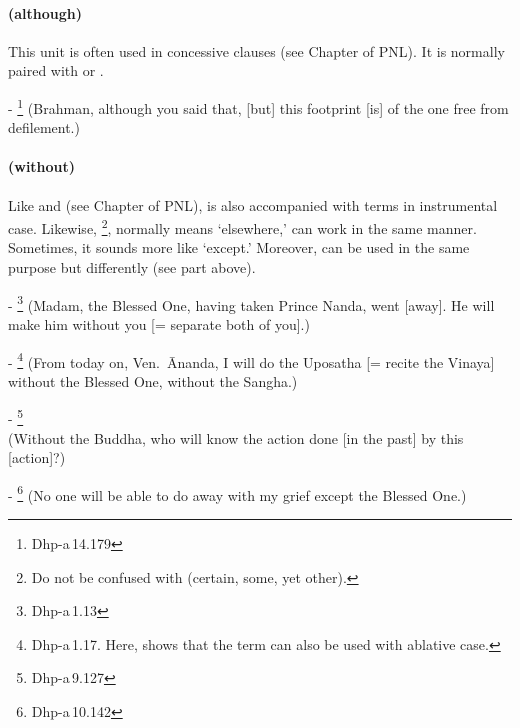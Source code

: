 \paragraph*{ (although)} This unit is often used in concessive clauses (see Chapter  of PNL). It is normally paired with  or .\par
- \footnote{Dhp-a\,14.179} (Brahman, although you said that, [but] this footprint [is] of the one free from defilement.)\par

\paragraph*{ (without)} Like  and  (see Chapter  of PNL),  is also accompanied with terms in instrumental case. Likewise, \footnote{Do not be confused with  (certain, some, yet other).}, normally means `elsewhere,' can work in the same manner. Sometimes, it sounds more like `except.' Moreover,  can be used in the same purpose but differently (see  part above).\par
- \footnote{Dhp-a\,1.13} (Madam, the Blessed One, having taken Prince Nanda, went [away]. He will make him without you [= separate both of you].)\par
- \footnote{Dhp-a\,1.17. Here,  shows that the term can also be used with ablative case.} (From today on, Ven.\ \=Ananda, I will do the Uposatha [= recite the Vinaya] without the Blessed One, without the Sangha.)\par
- \footnote{Dhp-a\,9.127} \\(Without the Buddha, who will know the action done [in the past] by this [action]?)\par
- \footnote{Dhp-a\,10.142} (No one will be able to do away with my grief except the Blessed One.)\par

